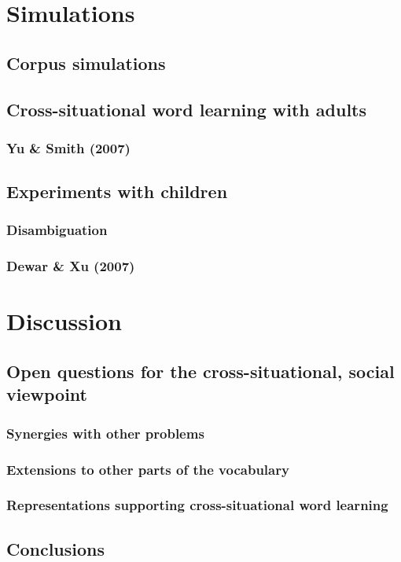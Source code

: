 \documentclass[man,noapacite,12pt]{apa2}
\begin{document}
\section{Simulations}

\subsection{Corpus simulations}



\subsection{Cross-situational word learning with adults}

\subsubsection{Yu \& Smith (2007)}

\subsection{Experiments with children}

\subsubsection{Disambiguation}

\subsubsection{Dewar \& Xu (2007)}



\section{Discussion}



\subsection{Open questions for the cross-situational, social viewpoint}

\subsubsection{Synergies with other problems}

\subsubsection{Extensions to other parts of the vocabulary}

\subsubsection{Representations supporting cross-situational word learning}

\cite{yurovskyunderreview}

\subsection{Conclusions}

\newpage



\end{document}
